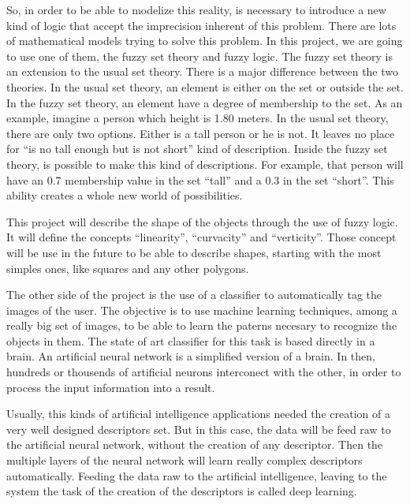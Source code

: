 So, in order to be able to modelize this reality, is necessary to introduce a new kind of logic that accept the imprecision inherent of this problem. There are lots of mathematical models trying to solve this problem. In this project, we are going to use one of them, the fuzzy set theory and fuzzy logic. The fuzzy set theory is an extension to the usual set theory. There is a major difference between the two theories. In the usual set theory, an element is either on the set or outside the set. In the fuzzy set theory, an element have a degree of membership to the set. As an example, imagine a person which height is 1.80 meters. In the usual set theory, there are only two options. Either is a tall person or he is not. It leaves no place for “is no tall enough but is not short” kind of description. Inside the fuzzy set theory, is possible to make this kind of descriptions. For example, that person will have an 0.7 membership value in the set “tall” and a 0.3 in the set “short”. This ability creates a whole new world of possibilities.

This project will describe the shape of the objects through the use of fuzzy logic. It will define the concepts “linearity”, “curvacity” and “verticity”. Those concept will be use in the future to be able to describe shapes, starting with the most simples ones, like squares and any other polygons.

The other side of the project is the use of a classifier to automatically tag the images of the user. The objective is to use machine learning techniques, among a really big set of images, to be able to learn the paterns necesary to recognize the objects in them. The state of art classifier for this task is based directly in a brain. An artificial neural network is a simplified version of a brain. In then, hundreds or thousends of artificial neurons interconect with the other, in order to process the input information into a result.

Usually, this kinds of artificial intelligence applications needed the creation of a very well designed descriptors set. But in this case, the data will be feed raw to the artificial neural network, without the creation of any descriptor. Then the multiple layers of the neural network will learn really complex descriptors automatically.  Feeding the data raw to the artificial intelligence, leaving to the system the task of the creation of the descriptors is called deep learning.

